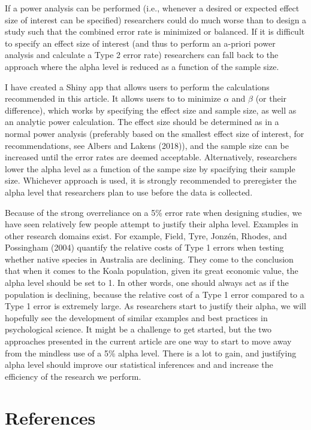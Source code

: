 \documentclass[,jou,floatsintext]{apa6}
\begin{document}
If a power analysis can be performed (i.e., whenever a desired or expected effect size of interest can be specified) researchers could do much worse than to design a study such that the combined error rate is minimized or balanced. If it is difficult to specify an effect size of interest (and thus to perform an a-priori power analysis and calculate a Type 2 error rate) researchers can fall back to the approach where the alpha level is reduced as a function of the sample size.

I have created a Shiny app that allows users to perform the calculations recommended in this article. It allows users to to minimize \(\alpha\) and \(\beta\) (or their difference), which works by specifying the effect size and sample size, as well as an analytic power calculation. The effect size should be determined as in a normal power analysis (preferably based on the smallest effect size of interest, for recommendations, see Albers and Lakens (2018)), and the sample size can be increased until the error rates are deemed acceptable. Alternatively, researchers lower the alpha level as a function of the sampe size by spacifying their sample size. Whichever approach is used, it is strongly recommended to preregister the alpha level that researchers plan to use before the data is collected.

Because of the strong overreliance on a 5\% error rate when designing studies, we have seen relatively few people attempt to justify their alpha level. Examples in other research domains exist. For example, Field, Tyre, Jonzén, Rhodes, and Possingham (2004) quantify the relative costs of Type 1 errors when testing whether native species in Australia are declining. They come to the conclusion that when it comes to the Koala population, given its great economic value, the alpha level should be set to 1. In other words, one should always act as if the population is declining, because the relative cost of a Type 1 error compared to a Type 1 error is extremely large. As researchers start to justify their alpha, we will hopefully see the development of similar examples and best practices in psychological science. It might be a challenge to get started, but the two approaches presented in the current article are one way to start to move away from the mindless use of a 5\% alpha level. There is a lot to gain, and justifying alpha level should improve our statistical inferences and and increase the efficiency of the research we perform.

\hypertarget{references}{%
\section{References}\label{references}}
\end{document}
